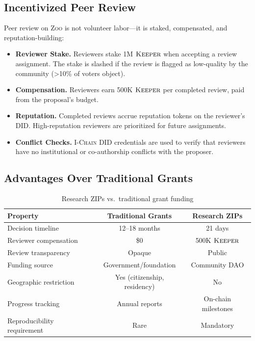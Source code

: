 \documentclass[11pt,letterpaper]{article}
\theoremstyle{definition}
\theoremstyle{remark}
\newcommand{\Zoo}{\textsc{Zoo}}
\newcommand{\IChain}{\textsc{I-Chain}}
\newcommand{\KEEPER}{\textsc{Keeper}}
\newcommand{\DID}{\textsc{DID}}
\newcommand{\DAO}{\textsc{DAO}}
\begin{document}
\subsection{Incentivized Peer Review}

Peer review on \Zoo{} is not volunteer labor---it is staked, compensated, and reputation-building:

\begin{itemize}
    \item \textbf{Reviewer Stake.} Reviewers stake 1M $\KEEPER$ when accepting a review assignment. The stake is slashed if the review is flagged as low-quality by the community (>10\% of voters object).
    \item \textbf{Compensation.} Reviewers earn 500K $\KEEPER$ per completed review, paid from the proposal's budget.
    \item \textbf{Reputation.} Completed reviews accrue reputation tokens on the reviewer's \DID{}. High-reputation reviewers are prioritized for future assignments.
    \item \textbf{Conflict Checks.} \IChain{} \DID{} credentials are used to verify that reviewers have no institutional or co-authorship conflicts with the proposer.
\end{itemize}

\subsection{Advantages Over Traditional Grants}

\begin{table}[h]
\centering
\begin{tabular}{lcc}
\toprule
\textbf{Property} & \textbf{Traditional Grants} & \textbf{Research ZIPs} \\
\midrule
Decision timeline & 12--18 months & 21 days \\
Reviewer compensation & \$0 & 500K $\KEEPER$ \\
Review transparency & Opaque & Public \\
Funding source & Government/foundation & Community \DAO{} \\
Geographic restriction & Yes (citizenship, residency) & No \\
Progress tracking & Annual reports & On-chain milestones \\
Reproducibility requirement & Rare & Mandatory \\
\bottomrule
\end{tabular}
\caption{Research ZIPs vs.\ traditional grant funding}
\label{tab:grants_comparison}
\end{table}
\end{document}
